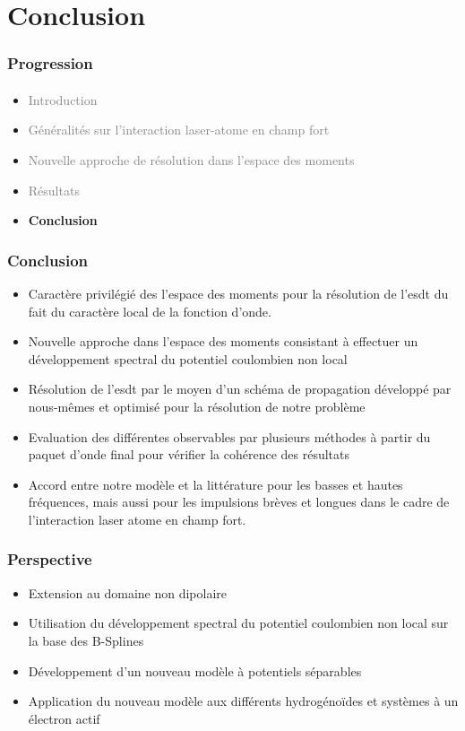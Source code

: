\section{Conclusion}

\begin{frame}
 \frametitle{Progression}
 \framesubtitle{}
 \begin{itemize}
   \item \textcolor{gray}{Introduction}
   \item \textcolor{gray}{G\'en\'eralit\'es sur l'interaction laser-atome
en champ fort}
   \item \textcolor{gray}{Nouvelle approche de r\'esolution 
dans l'espace des moments}
   \item \textcolor{gray}{R\'esultats}
   \item \textbf{Conclusion}
 \end{itemize}
\end{frame}


\begin{frame}
 \frametitle{Conclusion}
  \footnotesize
  \begin{itemize}
    \item Caract\`ere privil\'egi\'e des l'espace des moments 
pour la r\'esolution de l'\acrshort{esdt} du fait du caract\`ere local 
de la fonction d'onde.
\item Nouvelle approche dans l'espace des moments 
consistant \`a effectuer un d\'eveloppement spectral du potentiel 
coulombien non local
\item R\'esolution de l'\acrshort{esdt} par le moyen 
d'un sch\'ema de propagation d\'evelopp\'e par nous-m\^emes 
et optimis\'e pour la r\'esolution de notre probl\`eme 
\item Evaluation des diff\'erentes observables par plusieurs m\'ethodes 
\`a partir du paquet d'onde final pour v\'erifier la coh\'erence 
des r\'esultats 
\item Accord entre notre mod\`ele et la litt\'erature
pour les basses et hautes fr\'equences, mais aussi
pour les impulsions br\`eves et longues dans le cadre de l'interaction  
laser atome en champ fort.
  \end{itemize}
\end{frame}


\begin{frame}
 \frametitle{Perspective}
  \footnotesize
  \begin{itemize}
    \item Extension au domaine non dipolaire
    \item Utilisation du d\'eveloppement spectral du potentiel 
coulombien non local sur la base des B-Splines
    \item D\'eveloppement d'un nouveau mod\`ele \`a potentiels s\'eparables 
    \item Application du nouveau mod\`ele aux diff\'erents 
hydrog\'eno\"ides et syst\`emes \`a un \'electron actif
  \end{itemize}
\end{frame}


